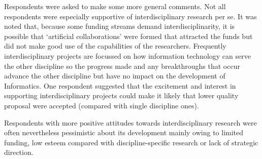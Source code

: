 Respondents were asked to make some more general comments. Not all respondents were especially supportive of interdisciplinary research per se. It was noted that, because some funding streams demand interdisciplinarity, it is possible that `artificial collaborations' were formed that attracted the funds but did not make good use of the capabilities of the researchers. Frequently interdisciplinary projects are focussed on how information technology can serve the other discipline so the progress made and any breakthroughs that occur advance the other discipline but have no impact on the development of Informatics. One respondent suggested that the excitement and interest in supporting interdisciplinary projects could make it likely that lower quality proposal were accepted (compared with single discipline ones).

Respondents with more positive attitudes towards interdisciplinary research were often nevertheless pessimistic about its development mainly owing to limited funding, low esteem compared with discipline-specific research or lack of strategic direction.

